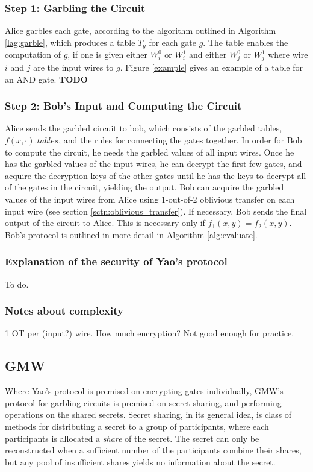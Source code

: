 \documentclass[12pt,twoside]{reedthesis}
\begin{document}
\subsubsection{Step 1: Garbling the Circuit}
Alice garbles each gate, according to the algorithm outlined in Algorithm \ref{lag:garble}, which produces a table $T_g$ for each gate $g$.
The table enables the computation of $g$, if one is given either $W^0_i$ or $W^1_i$ and either $W^0_j$ or $W^1_j$ where wire $i$ and $j$ are the input wires to $g$.
Figure \ref{example} gives an example of a table for an AND gate. \textbf{TODO}

\subsubsection{Step 2: Bob's Input and Computing the Circuit}
Alice sends the garbled circuit to bob, which consists of the garbled tables, $f(x,\cdot).tables$, and the rules for connecting the gates together.
In order for Bob to compute the circuit, he needs the garbled values of all input wires.
Once he has the garbled values of the input wires, he can decrypt the first few gates, and acquire the decryption keys of the other gates until he has the keys to decrypt all of the gates in the circuit, yielding the output.
Bob can acquire the garbled values of the input wires from Alice using 1-out-of-2 oblivious transfer on each input wire (see section \ref{sctn:oblivious_transfer}).
If necessary, Bob sends the final output of the circuit to Alice. 
This is necessary only if $f_1(x,y) = f_2(x,y)$. 
Bob's protocol is outlined in more detail in Algorithm \ref{alg:evaluate}.

\subsubsection{Explanation of the security of Yao's protocol}
To do.

\subsubsection{Notes about complexity}
1 OT per (input?) wire.
How much encryption?
Not good enough for practice.

\subsection{GMW}
Where Yao's protocol is premised on encrypting gates individually, GMW's protocol for garbling circuits is premised on secret sharing, and performing operations on the shared secrets. 
Secret sharing, in its general idea, is class of methods for distributing a secret to a group of participants, where each participants is allocated a \textit{share} of the secret. 
The secret can only be reconstructed when a sufficient number of the participants combine their shares, but any pool of insufficient shares yields no information about the secret.
\end{document}
